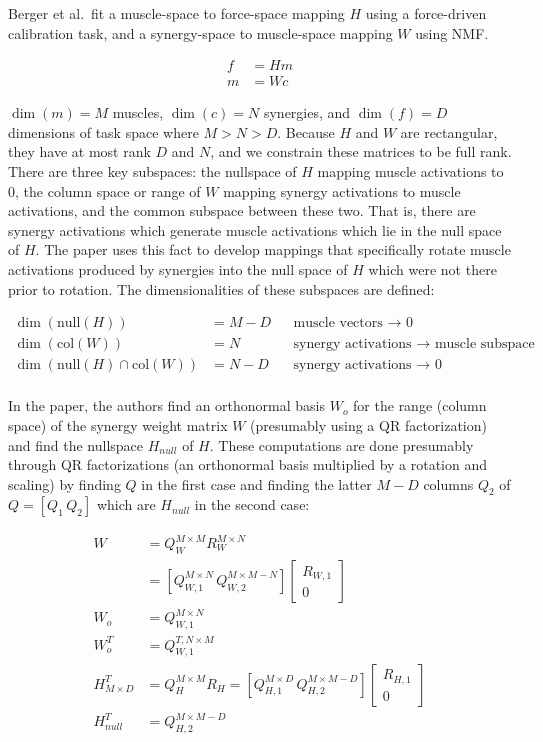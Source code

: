 \documentclass[
  a4paper,
]{article}
\begin{document}
Berger et al.~fit a muscle-space to force-space mapping \(H\) using a
force-driven calibration task, and a synergy-space to muscle-space
mapping \(W\) using NMF.

\begin{align*}
    f &= Hm \\
    m &= Wc
\end{align*}

\(\dim(m)=M\) muscles, \(\dim(c)=N\) synergies, and \(\dim(f)=D\)
dimensions of task space where \(M>N>D\). Because \(H\) and \(W\) are
rectangular, they have at most rank \(D\) and \(N\), and we constrain
these matrices to be full rank. There are three key subspaces: the
nullspace of \(H\) mapping muscle activations to 0, the column space or
range of \(W\) mapping synergy activations to muscle activations, and
the common subspace between these two. That is, there are synergy
activations which generate muscle activations which lie in the null
space of \(H\). The paper uses this fact to develop mappings that
specifically rotate muscle activations produced by synergies into the
null space of \(H\) which were not there prior to rotation. The
dimensionalities of these subspaces are defined:

\begin{align*}
\dim(\mathrm{null}(H)) &= M - D && \text{muscle vectors $\rightarrow$ 0} \\
\dim(\mathrm{col}(W)) &= N && \text{synergy activations $\rightarrow$ muscle subspace}\\
\dim(\mathrm{null}(H)\cap\mathrm{col}(W)) &= N - D && \text{synergy activations $\rightarrow$ 0} \\
\end{align*}

In the paper, the authors find an orthonormal basis \(W_o\) for the
range (column space) of the synergy weight matrix \(W\) (presumably
using a QR factorization) and find the nullspace \(H_{null}\) of \(H\).
These computations are done presumably through QR factorizations (an
orthonormal basis multiplied by a rotation and scaling) by finding \(Q\)
in the first case and finding the latter \(M-D\) columns \(Q_2\) of
\(Q = [Q_1 \, Q_2]\) which are \(H_{null}\) in the second case:

\begin{align*}
    W &= Q_W^{M\times M}R_W^{M\times N} \\
      &= \left[Q_{W,1}^{M\times N}\,Q_{W,2}^{M\times M-N}\right]\begin{bmatrix}R_{W,1} \\ 0 \end{bmatrix} \\
    W_o &= Q_{W,1}^{M\times N} \\
    W_o^T &= Q_{W,1}^{T, N\times M} \\
    H^T_{M\times D} &= Q_H^{M\times M}R_H = \left[Q_{H,1}^{M\times D}\,Q_{H,2}^{M\times M-D}\right]\begin{bmatrix}R_{H,1} \\ 0 \end{bmatrix} \\
    H^T_{null} &= Q_{H,2}^{M\times M-D}
\end{align*}
\end{document}
